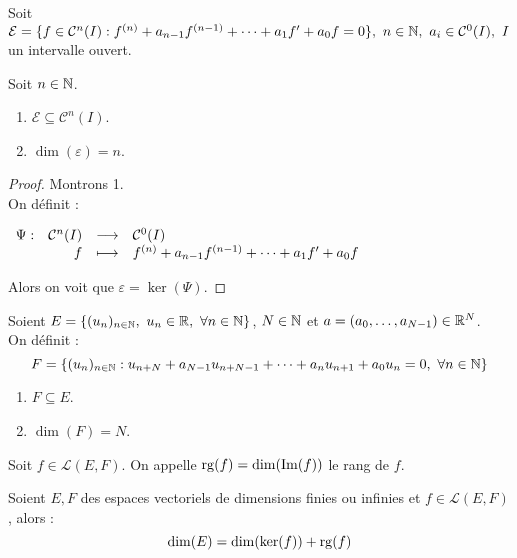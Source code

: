 Soit $\mathcal{E} = \{ f \in \mathcal{C}^n(I) : f^{(n)} + a_{n - 1} f^{(n - 1)} + \cdots + a_1 f' + a_0 f = 0 \},\ n \in \mathbb{N},\ a_i \in \mathcal{C}^0(I),\ I$ un intervalle ouvert.

\begin{proposition}
    Soit $n \in \mathbb{N}$.
    \begin{multicols}{2}
        \begin{enumerate}
            \item $\mathcal{E} \subseteq \mathcal{C}^n(I)$.
            \item $\dim(\varepsilon) = n$.
        \end{enumerate}
    \end{multicols}
\end{proposition}

\begin{proof}
	Montrons 1. \\
	On définit :
	\begin{center}
		$\begin{array}{rrcl} \Psi : & \mathcal{C}^n(I) & \longrightarrow & \mathcal{C}^0(I) \\ & f & \longmapsto & f^{(n)} + a_{n-1}f^{(n-1)} + \cdots + a_1 f' + a_0 f \end{array}$
	\end{center}
	Alors on voit que $\varepsilon = \ker(\Psi)$.
\end{proof}

Soient $E = \{ (u_n)_{n \in \mathbb{N}},\ u_n \in \mathbb{R},\ \forall n \in \mathbb{N} \}$, $N \in \mathbb{N}$ et $a = (a_0, \ldots, a_{N-1}) \in \mathbb{R}^N$.
\\
On définit :
\[ F = \{ (u_n)_{n \in \N} : u_{n + N} + a_{N-1} u_{n + N - 1} + \cdots + a_n u_{n+1} + a_0 u_n = 0,\ \forall n \in \N \} \]

\begin{theorem}
	\begin{multicols}{2}
		\begin{enumerate}
			\item $F \subseteq E$.
			\item $\dim(F) = N$.
		\end{enumerate}
	\end{multicols}
\end{theorem}

\begin{definition}
    Soit $f \in \mathcal{L}(E, F)$. On appelle $\operatorname{rg}(f) = \dim(\Im(f))$ le rang de $f$.
\end{definition}

\begin{theorem}
    Soient $E, F$ des espaces vectoriels de dimensions finies ou infinies et $f \in \mathcal{L}(E, F)$, alors :
    \[ \dim(E) = \dim(\ker(f)) + \operatorname{rg}(f) \]
\end{theorem}

